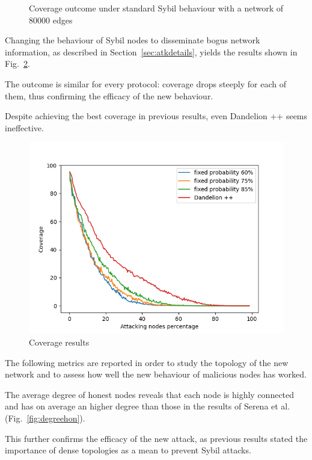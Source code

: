 \begin{figure}[ht]
\begin{minipage}[b]{0.5\linewidth}
			\centering 
			\caption{Coverage outcome under standard Sybil behaviour with a network of 80000 edges}
			\label{fig:notatk80}
        \end{minipage}
    \end{figure}

Changing the behaviour of Sybil nodes to disseminate bogus network information, as described in Section~\ref{sec:atkdetails}, yields the results shown in Fig.~\ref{fig:in-cov}.

The outcome is similar for every protocol: coverage drops steeply for each of them, thus confirming the efficacy of the new behaviour.

Despite achieving the best coverage in previous results, even Dandelion ++ seems ineffective.\par

\begin{figure}[h]
	\includegraphics[width=.8\textwidth]{pict/results/in-cov.png}
	\centering 
	\caption{Coverage results}
	\label{fig:in-cov}
\end{figure}

The following metrics are reported in order to study the topology of the new network and to assess how well the new behaviour of malicious nodes has worked.

The average degree of honest nodes reveals that each node is highly connected and has on average an higher degree than those in the results of Serena et al. (Fig.~\ref{fig:degreehon}).

This further confirms the efficacy of the new attack, as previous results stated the importance of dense topologies as a mean to prevent Sybil attacks.\par

